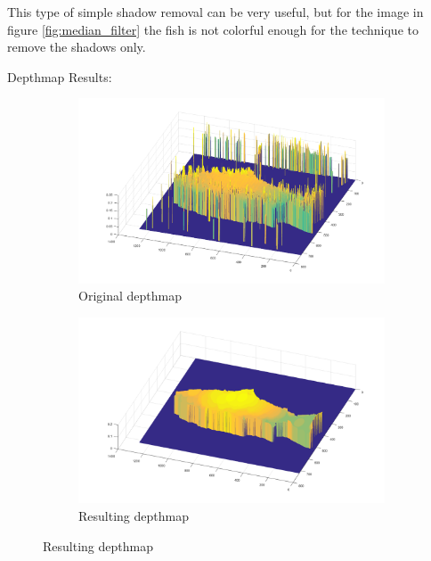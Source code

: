 This type of simple shadow removal can be very useful, but for the image in figure \ref{fig:median_filter} the fish is not colorful enough for the technique to remove the shadows only.



Depthmap Results:

\begin{figure}[H]
    \centering
    \begin{subfigure}{1\textwidth}
        \centering
        \includegraphics[width=.9\linewidth]{images/results/3D_plots/original_3D_63}
        \caption{Original depthmap} 
        \label{fig:3D_original_63}
    \end{subfigure}\hspace*{\fill}
    
    \medskip
    \begin{subfigure}{1\textwidth}
        \centering
        \includegraphics[width=.9\linewidth]{images/results/3D_plots/fixed_3D_63}
        \caption{Resulting depthmap} 
        \label{fig:3D_fixed_63}
    \end{subfigure}\hspace*{\fill}
    

\end{figure}
